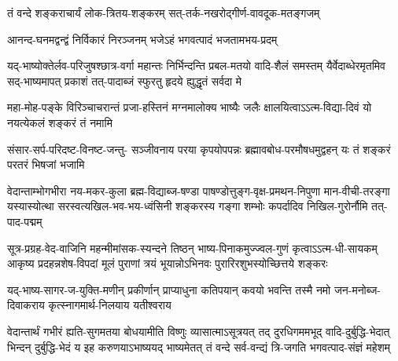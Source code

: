 
\twolineshloka
{तं वन्दे शङ्कराचार्यं लोक-त्रितय-शङ्करम्}
{सत्-तर्क-नखरोद्गीर्ण-वावदूक-मतङ्गजम्}


\twolineshloka
{आनन्द-घनमद्वन्द्वं निर्विकारं निरञ्जनम्}
{भजेऽहं भगवत्पादं भजतामभय-प्रदम्}


\fourlineindentedshloka
{यद्-भाष्योक्तेर्लव-परिजुषश्छात्र-वर्गा महान्तः}
{निर्भिन्दन्ति प्रबल-मतयो वादि-शैलं समस्तम्}
{यैर्वेदाब्धेरमृतमिव सद्-भाष्यमापत् प्रकाशं}
{तत्-पादाब्जं स्फुरतु हृदये ह्युद्धृतं सर्वदा मे}


\fourlineindentedshloka
{महा-मोह-पङ्के विरिञ्चाचरान्तं}
{प्रजा-हस्तिनं मग्नमालोक्य भाष्यैः}
{जलैः क्षालयित्वाऽऽत्म-विद्या-दिवं यो}
{नयत्येकलं शङ्करं तं नमामि}


\fourlineindentedshloka
{संसार-सर्प-परिदष्ट-विनष्ट-जन्तु-}
{सञ्जीवनाय परया कृपयोपपन्नः}
{ब्रह्मावबोध-परमौषधमुद्वहन् यः}
{तं शङ्करं परतरं भिषजां भजामि}


\fourlineindentedshloka
{वेदान्ताम्भोगभीरा नय-मकर-कुला ब्रह्म-विद्याब्ज-षण्डा}
{पाषण्डोत्तुङ्ग-वृक्ष-प्रमथन-निपुणा मान-वीची-तरङ्गा}
{यस्यास्योत्था सरस्वत्यखिल-भव-भय-ध्वंसिनी शङ्करस्य}
{गङ्गा शम्भोः कपर्दादिव निखिल-गुरोर्नौमि तत्-पाद-पद्मम्}


\fourlineindentedshloka
{सूत्र-प्रग्रह-वेद-वाजिनि महन्मीमांसक-स्यन्दने}
{तिष्ठन् भाष्य-पिनाकमुज्ज्वल-गुणं कृत्वाऽऽत्म-धी-सायकम्}
{आकृष्य प्रदहन्नशेष-विपदां मूलं पुराणां त्रयं}
{भूयान्नोऽभिनवः पुरारिरशुभस्योच्छित्तये शङ्करः}


\fourlineindentedshloka
{यद्-भाष्य-सागर-ज-युक्ति-मणीन् प्रकीर्णान्}
{प्राप्याधुना कतिपयान् कवयो भवन्ति}
{तस्मै नमो जन-मनोब्ज-दिवाकराय}
{कृत्स्नागमार्थ-निलयाय यतीश्वराय}


\fourlineindentedshloka
{वेदान्तार्थं गभीरं ह्यति-सुगमतया बोधयामीति विष्णुः}
{व्यासात्माऽसूत्रयत् तद् दुरधिगममभूद् वादि-दुर्बुद्धि-भेदात्}
{भिन्दन् दुर्बुद्धि-भेदं य इह करुणयाऽभाष्ययद् भाष्यमेतत्}
{तं वन्दे सर्व-वन्द्यं त्रि-जगति भगवत्पाद-संज्ञं महेशम्}


